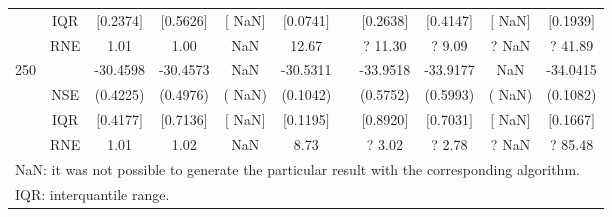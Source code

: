 {{\begin{longtable}{ccccccccccc}
 & IQR & $[$0.2374$]$ & $[$0.5626$]$ & $[$   NaN$]$ & $[$0.0741$]$ & & $[$0.2638$]$ & $[$0.4147$]$  &$[$   NaN$]$ & $[$0.1939$]$  \\  
  & RNE &   1.01 &   1.00 &    NaN &  12.67 &  &?  11.30 & ?   9.09 &  ?    NaN & ?  41.89   \\ [1ex] 
250 & & -30.4598 & -30.4573 &    NaN & -30.5311 & & -33.9518 & -33.9177 &    NaN & -34.0415  \\ 
  & NSE & (0.4225) & (0.4976) & (   NaN) & (0.1042) & & (0.5752) & (0.5993) & (   NaN) & (0.1082)   \\ 
 & IQR & $[$0.4177$]$ & $[$0.7136$]$ & $[$   NaN$]$ & $[$0.1195$]$ & & $[$0.8920$]$ & $[$0.7031$]$  &$[$   NaN$]$ & $[$0.1667$]$  \\  
  & RNE &   1.01 &   1.02 &    NaN &   8.73 &  &?   3.02 & ?   2.78 &  ?    NaN & ?  85.48   \\ [1ex] 
\hline 
  \multicolumn{11}{l}{\footnotesize{NaN: it was not possible to generate the particular result with the corresponding algorithm.}} \\ 
  \multicolumn{11}{l}{\footnotesize{IQR: interquantile range.}} \\ 
\end{longtable} 
} 
} 
